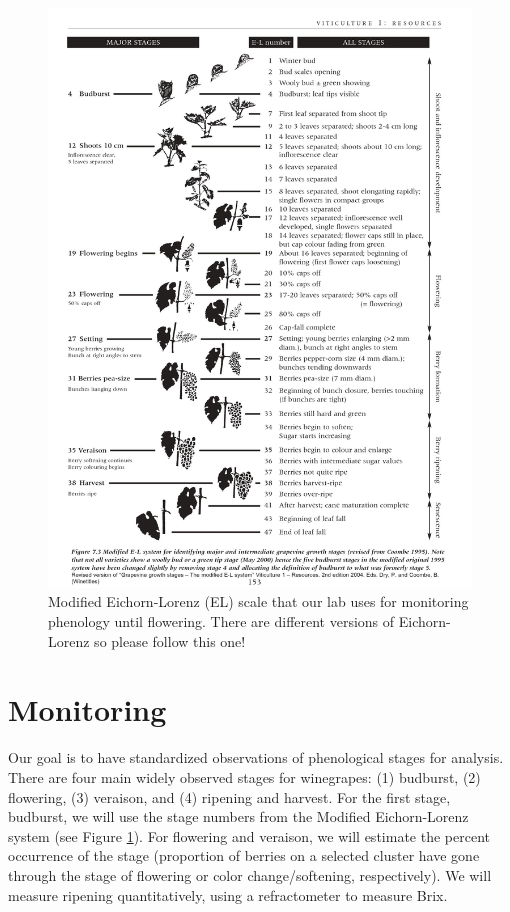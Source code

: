 \documentclass[11pt,letter]{article}
\begin{document}
\begin{figure}
  \includegraphics[width=\linewidth]{ELScale.jpg}
  \caption{ Modified Eichorn-Lorenz (EL) scale that our lab uses for monitoring phenology until flowering. There are different versions of Eichorn-Lorenz so please follow this one! }
  \label{fig:ELScale}
\end{figure}

\section{Monitoring}
Our goal is to have standardized observations of phenological stages for analysis. There are four main widely observed stages for winegrapes: (1) budburst, (2) flowering, (3) veraison, and (4) ripening and harvest. For the first stage, budburst, we will use the stage numbers from the Modified Eichorn-Lorenz system (see Figure \ref{fig:ELScale}). For flowering and veraison, we will estimate the percent occurrence of the stage (proportion of berries on a selected cluster have gone through the stage of flowering or color change/softening, respectively). We will measure ripening quantitatively, using a refractometer to measure Brix.
\end{document}
